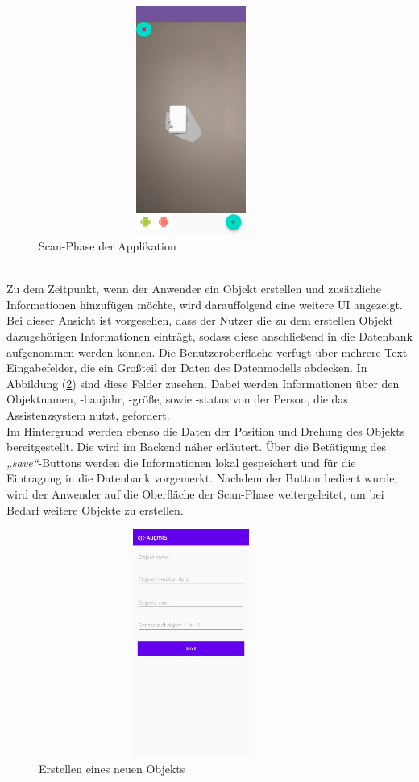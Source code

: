 \begin{figure}[hbt!]
    \centering
    \includegraphics[width=10cm,height=7.5cm,keepaspectratio]{4Umsetzung/Bilder/scan-phase.jpg}
    \caption{Scan-Phase der Applikation}
    \label{pic:scan}
\end{figure}
\\ 
\linebreak
Zu dem Zeitpunkt, wenn der Anwender ein Objekt erstellen und zusätzliche Informationen hinzufügen möchte, wird darauffolgend eine weitere \acs{UI} 
angezeigt. Bei dieser Ansicht ist vorgesehen, dass der Nutzer die zu dem erstellen Objekt dazugehörigen Informationen einträgt, sodass diese anschließend 
in die Datenbank aufgenommen werden können. Die Benutzeroberfläche verfügt über mehrere Text-Eingabefelder, die ein Großteil der Daten des Datenmodells 
abdecken. In Abbildung (\ref{pic:createObject}) sind diese Felder zusehen. Dabei werden Informationen über den Objektnamen, -baujahr, -größe, sowie 
-status von der Person, die das Assistenzsystem nutzt, gefordert. 
\\ 
Im Hintergrund werden ebenso die Daten der Position und Drehung des 
Objekts bereitgestellt. Die wird im Backend näher erläutert. Über die Betätigung des \textit{„save“}-Buttons werden die Informationen lokal gespeichert und für die Eintragung in die Datenbank 
vorgemerkt. Nachdem der Button bedient wurde, wird der Anwender auf die Oberfläche der Scan-Phase weitergeleitet, um bei Bedarf weitere Objekte zu 
erstellen.  
\begin{figure}[hbt!]
    \centering
    \includegraphics[width=10cm,height=7.5cm,keepaspectratio]{4Umsetzung/Bilder/objekt_info.jpg}
    \caption{Erstellen eines neuen Objekts}
    \label{pic:createObject}
\end{figure}
